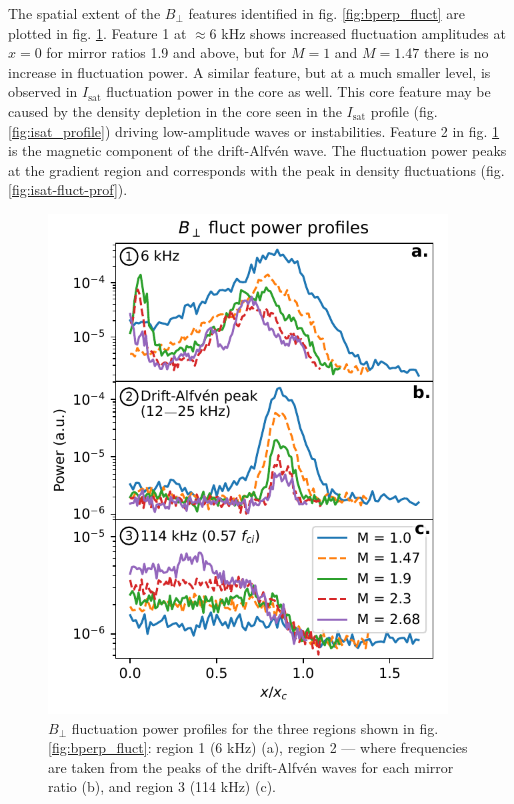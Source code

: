 The spatial extent of the $B_\perp$ features identified in fig. \ref{fig:bperp_fluct} are plotted in fig. \ref{fig:Bperp_power_profiles}. Feature 1 at $\approx 6$ kHz shows increased fluctuation amplitudes at $x=0$ for mirror ratios 1.9 and above, but for $M=1$ and $M=1.47$ there is no increase in fluctuation power. A similar feature, but at a much smaller level, is observed in $I_\text{sat}$ fluctuation power in the core as well. This core feature may be caused by the density depletion in the core seen in the $I_\text{sat}$ profile (fig. \ref{fig:isat_profile}) driving low-amplitude waves or instabilities. Feature 2 in fig. \ref{fig:Bperp_power_profiles} is the magnetic component of the drift-Alfv\'en wave. The fluctuation power peaks at the gradient region and corresponds with the peak in density fluctuations (fig. \ref{fig:isat-fluct-prof}). 

\begin{figure}
    \centering
    \includegraphics[width=300pt]{figures/fig14.pdf}
    \caption[$B_\perp$ fluctuation power profiles for three regions]{$B_\perp$ fluctuation power profiles for the three regions shown in fig. \ref{fig:bperp_fluct}: region 1 (6 kHz) (a), region 2 — where frequencies are taken from the peaks of the drift-Alfv\'en waves for each mirror ratio (b), and region 3 (114 kHz) (c).}
    \label{fig:Bperp_power_profiles}
\end{figure}

